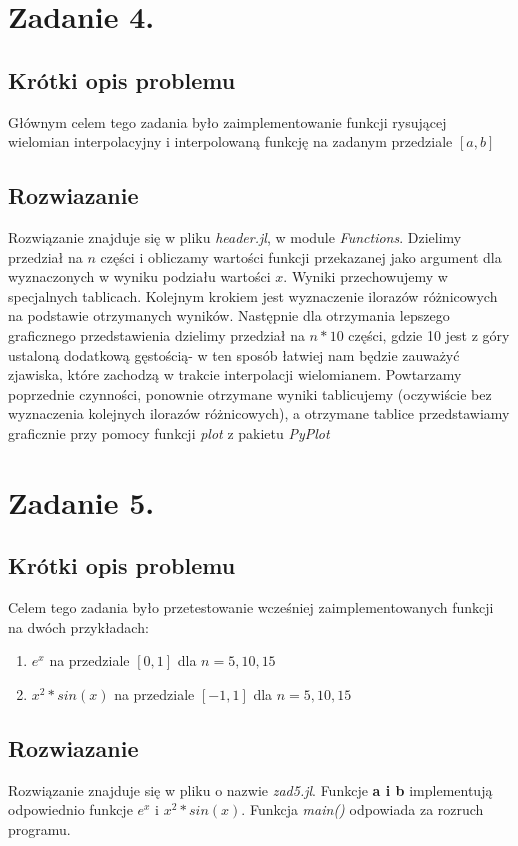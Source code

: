 \documentclass[a4paper,14pt]{report}
\begin{document}
\chapter{Zadanie 4.}
  \section{Krótki opis problemu}
    Głównym celem tego zadania było zaimplementowanie funkcji rysującej wielomian interpolacyjny i interpolowaną funkcję na zadanym przedziale $[a,b]$
  \section{Rozwiazanie}
    Rozwiązanie znajduje się w pliku \textit{header.jl}, w module \textit{Functions}. Dzielimy przedział na $n$ części i obliczamy wartości funkcji przekazanej jako argument dla wyznaczonych w wyniku podziału wartości $x$. Wyniki przechowujemy w specjalnych tablicach. Kolejnym krokiem jest wyznaczenie ilorazów różnicowych na podstawie otrzymanych wyników. Następnie dla otrzymania lepszego graficznego przedstawienia dzielimy przedział na $n*10$ części, gdzie 10 jest z góry ustaloną dodatkową gęstością- w ten sposób łatwiej nam będzie zauważyć zjawiska, które zachodzą w trakcie interpolacji wielomianem. Powtarzamy poprzednie czynności, ponownie otrzymane wyniki tablicujemy (oczywiście bez wyznaczenia kolejnych ilorazów różnicowych), a otrzymane tablice przedstawiamy graficznie przy pomocy funkcji \textit{plot} z pakietu \textit{PyPlot}
\chapter{Zadanie 5.}
  \section{Krótki opis problemu}
    Celem tego zadania było przetestowanie wcześniej zaimplementowanych funkcji na dwóch przykładach:
    \begin{enumerate}
      \item $e^{x}$ na przedziale $[0,1]$ dla $n=5,10,15$
      \item $x^{2}*sin(x)$ na przedziale $[-1,1]$ dla $n=5,10,15$
    \end{enumerate}
  \section{Rozwiazanie}
    Rozwiązanie znajduje się w pliku o nazwie \textit{zad5.jl}. Funkcje \textbf{a i b} implementują odpowiednio funkcje $e^{x}$ i $x^{2}*sin(x)$. Funkcja \textit{main()} odpowiada za rozruch programu.
\end{document}
